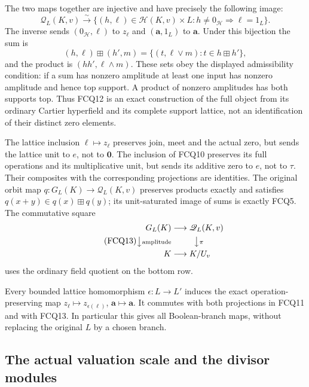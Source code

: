 The two maps together are injective and have precisely the
following image:
\begin{equation}\tag{FCQ12}
\mathscr Q_L(K,v)\xrightarrow{\ \sim\ }
\{(h,\ell)\in\mathscr H(K,v)\times L:
                  h\ne0_{\mathscr H}\Rightarrow\ell=1_L\}.
\end{equation}
The inverse sends $(0_{\mathscr H},\ell)$ to $z_\ell$
and $(\mathbf a,1_L)$ to $\mathbf a$.
Under this bijection the sum is
\[
(h,\ell)\boxplus(h',m)
 =\{(t,\ell\vee m):t\in h\boxplus h'\},
\]
and the product is $(hh',\ell\wedge m)$.
These sets obey the displayed admissibility condition:
if a sum has nonzero amplitude at least one input has
nonzero amplitude and hence top support. A product of
nonzero amplitudes has both supports top. Thus FCQ12
is an exact construction of the full object from its
ordinary Cartier hyperfield and its complete support lattice,
not an identification of their distinct zero elements.

The lattice inclusion $\ell\mapsto z_\ell$ preserves join,
meet and the actual zero, but sends the lattice unit to
$e$, not to $\mathbf0$. The inclusion of FCQ10 preserves
its full operations and its multiplicative unit, but sends
its additive zero to $e$, not to $\tau$. Their composites
with the corresponding projections are identities.
The original orbit map $q:G_L(K)\to\mathscr Q_L(K,v)$
preserves products exactly and satisfies
$q(x+y)\in q(x)\boxplus q(y)$; its unit-saturated image
of sums is exactly FCQ5. The commutative square
\begin{equation}\tag{FCQ13}
\begin{aligned}
G_L(K)&\longrightarrow\mathscr Q_L(K,v)\\
\big\downarrow{\scriptstyle\mathrm{amplitude}}
&\hspace{2.7em}\big\downarrow{\scriptstyle\pi}\\
K&\longrightarrow K/U_v
\end{aligned}
\end{equation}
uses the ordinary field quotient on the bottom row.

Every bounded lattice homomorphism $\epsilon:L\to L'$
induces the exact operation-preserving map
$z_\ell\mapsto z_{\epsilon(\ell)}$,
$\mathbf a\mapsto\mathbf a$.
It commutes with both projections in FCQ11 and with
FCQ13. In particular this gives all Boolean-branch maps,
without replacing the original $L$ by a chosen branch.

\subsection{The actual valuation scale and the divisor modules}

